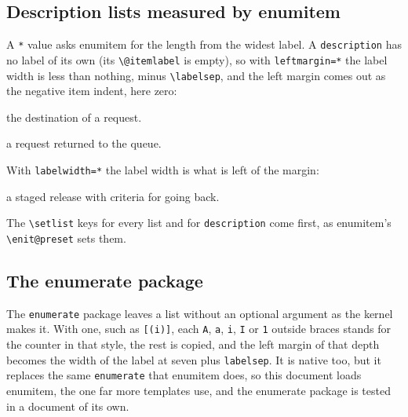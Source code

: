 \documentclass{article}
\numberwithin{equation}{section}
\theoremstyle{definition}
\theoremstyle{remark}
\begin{document}
\subsection{Description lists measured by enumitem}\label{sec:descstar}
A \texttt{*} value asks enumitem for the length from the widest label. A
\texttt{description} has no label of its own (its \verb|\@itemlabel| is empty), so with
\texttt{leftmargin=*} the label width is less than nothing, minus \verb|\labelsep|, and
the left margin comes out as the negative item indent, here zero:
\begin{description}[leftmargin=*]
  \item[Route] the destination of a request.
  \item[Rework] a request returned to the queue.
\end{description}
With \texttt{labelwidth=*} the label width is what is left of the margin:
\begin{description}[labelwidth=*]
  \item[Rollout] a staged release with criteria for going back.
\end{description}
The \texttt{\textbackslash setlist} keys for every list and for \texttt{description} come first, as
enumitem's \verb|\enit@preset| sets them.

\subsection{The enumerate package}
The \texttt{enumerate} package leaves a list without an optional argument as the kernel
makes it. With one, such as \texttt{[(i)]}, each \texttt{A}, \texttt{a}, \texttt{i},
\texttt{I} or \texttt{1} outside braces stands for the counter in that style, the rest is
copied, and the left margin of that depth becomes the width of the label at seven plus
\texttt{labelsep}. It is native too, but it replaces the same \texttt{enumerate} that
enumitem does, so this document loads enumitem, the one far more templates use, and the
enumerate package is tested in a document of its own.
\end{document}
